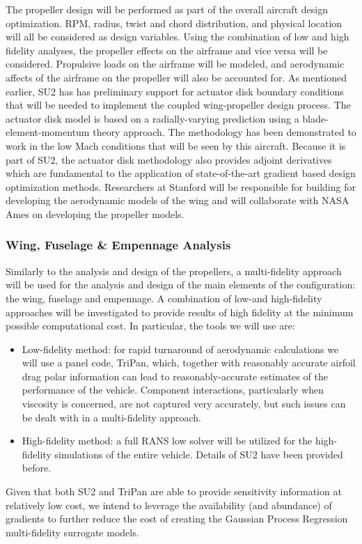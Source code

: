 \documentclass[]{aiaa-tc}
\begin{document}
    The propeller design will be performed as part of the overall aircraft design optimization. RPM, radius, twist and chord distribution, and 
    physical location will all be considered as design variables. Using the combination of low and high fidelity analyses, the propeller 
    effects on the airframe and vice versa will be considered. Propulsive loads on the airframe will be modeled, and aerodynamic affects of the
    airframe on the propeller will also be accounted for. As mentioned earlier, SU2 has has preliminary support for actuator 
    disk boundary conditions that will be needed to implement the coupled wing­-propeller design process. The actuator disk model is based on a radially-varying prediction using a blade-element-momentum theory approach. The methodology has been demonstrated to work in the low 
    Mach conditions that will be seen by this aircraft. Because it is part of SU2, the actuator disk methodology also provides adjoint derivatives 
    which are fundamental to the application of state-of-the-art gradient based design optimization methods. Researchers at Stanford will be responsible for building for developing the aerodynamic models of the wing and will collaborate with NASA Ames on developing the 
    propeller models. 

    \subsubsection{Wing, Fuselage \& Empennage Analysis}
    
    Similarly to the analysis and design of the propellers, a multi-fidelity approach will be used for the analysis and design of the main elements of the configuration: the wing, fuselage and empennage.  A combination of low-and high-fidelity approaches will be investigated to provide results of high fidelity at the minimum possible computational cost.  In particular, the tools we will use are:
%
    \begin{itemize}
    \item Low-fidelity method: for rapid turnaround of aerodynamic calculations we will use a panel code, TriPan, which, together with reasonably accurate airfoil drag polar information can lead to reasonably-accurate estimates of the performance of the vehicle.  Component interactions, particularly when viscosity is concerned, are not captured very accurately, but such issues can be dealt with in a  multi-fidelity approach.
    \item High-fidelity method: a full RANS low solver will be utilized for the high-fidelity simulations of the entire vehicle.  Details of SU2 have been provided before.
    \end{itemize}
    Given that both SU2 and TriPan are able to provide sensitivity information at relatively low cost, we intend to leverage the availability (and abundance) of gradients to further reduce the cost of creating the Gaussian Process Regression multi-fidelity surrogate models.
\end{document}
